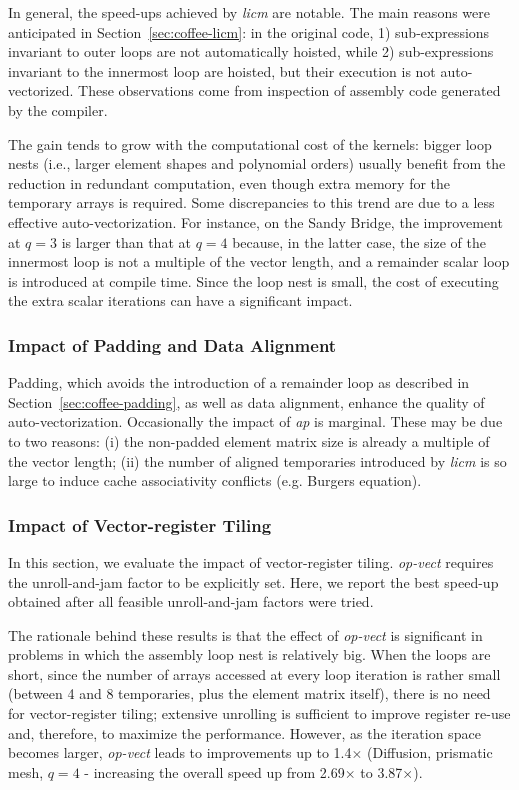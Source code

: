 In general, the speed-ups achieved by \emph{licm} are notable. The main reasons were anticipated in Section~\ref{sec:coffee-licm}: in the original code, 1) sub-expressions invariant to outer loops are not automatically hoisted, while 2) sub-expressions invariant to the innermost loop are hoisted, but their execution is not auto-vectorized. These observations come from inspection of assembly code generated by the compiler.

The gain tends to grow with the computational cost of the kernels: bigger loop nests (i.e., larger element shapes and polynomial orders) usually benefit from the reduction in redundant computation, even though extra memory for the temporary arrays is required. Some discrepancies to this trend are due to a less effective auto-vectorization. For instance, on the Sandy Bridge, the improvement at $q=3$ is larger than that at $q=4$ because, in the latter case, the size of the innermost loop is not a multiple of the vector length, and a remainder scalar loop is introduced at compile time. Since the loop nest is small, the cost of executing the extra scalar iterations can have a significant impact.

\subsubsection{Impact of Padding and Data Alignment}
\label{sec:perf-eval-padding}

Padding, which avoids the introduction of a remainder loop as described in Section~\ref{sec:coffee-padding}, as well as data alignment, enhance the quality of auto-vectorization. Occasionally the impact of \emph{ap} is marginal. These may be due to two reasons: (i) the non-padded element matrix size is already a multiple of the vector length; (ii) the number of aligned temporaries introduced by \emph{licm} is so large to induce cache associativity conflicts (e.g. Burgers equation).

\subsubsection{Impact of Vector-register Tiling}
\label{sec:perf-eval-opvect}

In this section, we evaluate the impact of vector-register tiling. \emph{op-vect} requires the unroll-and-jam factor to be explicitly set. Here, we report the best speed-up obtained after all feasible unroll-and-jam factors were tried. 

The rationale behind these results is that the effect of \emph{op-vect} is significant in problems in which the assembly loop nest is relatively big. When the loops are short, since the number of arrays accessed at every loop iteration is rather small (between 4 and 8 temporaries, plus the element matrix itself), there is no need for
vector-register tiling; extensive unrolling is sufficient to improve register re-use and, therefore, to maximize the performance. However, as the iteration space becomes larger, \emph{op-vect} leads to improvements up to 1.4$\times$ (Diffusion, prismatic mesh, $q=4$ - increasing the overall speed up from 2.69$\times$ to 3.87$\times$).

